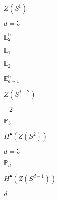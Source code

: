 \begin{preview}
\setcounter{equation}{0}%
\( Z(S^1) \)
\end{preview}

\begin{preview}
\setcounter{equation}{0}%
\( d=3 \)
\end{preview}

\begin{preview}
\setcounter{equation}{0}%
\( \mathbb{E}_2^{\mathrm{f r}} \)
\end{preview}

\begin{preview}
\setcounter{equation}{0}%
\( \mathbb{E}_1 \)
\end{preview}

\begin{preview}
\setcounter{equation}{0}%
\( \mathbb{E}_2 \)
\end{preview}

\begin{preview}
\setcounter{equation}{0}%
\(  \mathbb{E}^{\mathrm{f r}}_{d-1}   \)
\end{preview}

\begin{preview}
\setcounter{equation}{0}%
\( Z(S^{d-2}) \)
\end{preview}

\begin{preview}
\setcounter{equation}{0}%
\( -2 \)
\end{preview}

\begin{preview}
\setcounter{equation}{0}%
\( \mathbb{P}_3 \)
\end{preview}

\begin{preview}
\setcounter{equation}{0}%
\( H^{\bullet}(Z(S^2))  \)
\end{preview}

\begin{preview}
\setcounter{equation}{0}%
\( d=3 \)
\end{preview}

\begin{preview}
\setcounter{equation}{0}%
\( \mathbb{P}_d \)
\end{preview}

\begin{preview}
\setcounter{equation}{0}%
\( H^{\bullet}(Z(S^{d-1}) )\)
\end{preview}

\begin{preview}
\setcounter{equation}{0}%
\( d \)
\end{preview}

